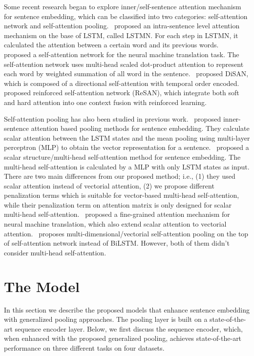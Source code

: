 \documentclass[11pt]{article}
\begin{document}
Some recent research began to explore inner/self-sentence attention mechanism for sentence embedding, which can be classified into two categories: self-attention network and self-attention pooling.~ proposed an intra-sentence level attention mechanism on the base of LSTM, called LSTMN. For each step in LSTMN, it calculated the attention between a certain word and its previous words.~ proposed a self-attention network for the neural machine translation task. The self-attention network uses multi-head scaled dot-product attention to represent each word by weighted summation of all word in the sentence.~ proposed DiSAN, which is composed of a directional self-attention with temporal order encoded.~ proposed reinforced self-attention network (ReSAN), which integrate
both soft and hard attention into one context fusion with reinforced learning. 

Self-attention pooling has also been studied in previous work.~ proposed inner-sentence attention based pooling methods for sentence embedding. They calculate scalar attention between the LSTM states and the mean pooling using multi-layer perceptron (MLP) to obtain the vector representation for a sentence.~ proposed a scalar structure/multi-head self-attention method for sentence embedding. The multi-head self-attention is calculated by a MLP with only LSTM states as input. There are two main differences from our proposed method; i.e., (1) they used scalar attention instead of vectorial attention, (2) we propose different penalization terms which is suitable for vector-based multi-head self-attention, while their penalization term on attention matrix is only designed for scalar multi-head self-attention.~ proposed a fine-grained attention mechanism for neural machine translation, which also extend scalar attention to vectorial attention.~ proposes multi-dimensional/vectorial self-attention pooling on the top of self-attention network instead of BiLSTM. However, both of them didn't consider multi-head self-attention.

\section{The Model}
In this section we describe the proposed models that enhance sentence embedding with generalized pooling approaches. The pooling layer is built on a state-of-the-art sequence encoder layer. Below, we first discuss the sequence encoder, which, when enhanced with the proposed generalized pooling, achieves state-of-the-art performance on three different tasks on four datasets.  
\end{document}
